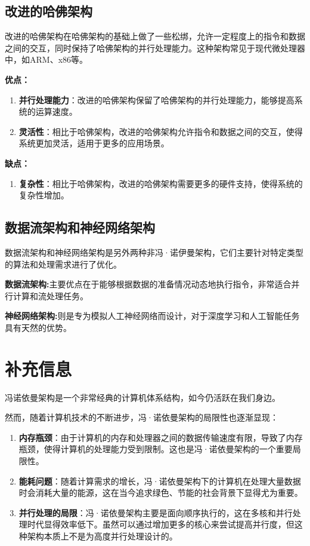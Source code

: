 \documentclass[12pt]{article} %
\theoremstyle{definition}
\begin{document}
\subsection{改进的哈佛架构}

改进的哈佛架构在哈佛架构的基础上做了一些松绑，允许一定程度上的指令和数据之间的交互，同时保持了哈佛架构的并行处理能力。这种架构常见于现代微处理器中，如ARM、x86等\cite{HarvardArchitecture, Pawson2022MythHarvard}。

\textbf{优点：}
\begin{enumerate}
  \item \textbf{并行处理能力}：改进的哈佛架构保留了哈佛架构的并行处理能力，能够提高系统的运算速度。
  \item \textbf{灵活性}：相比于哈佛架构，改进的哈佛架构允许指令和数据之间的交互，使得系统更加灵活，适用于更多的应用场景。
\end{enumerate}

\textbf{缺点：}
\begin{enumerate}
  \item \textbf{复杂性}：相比于哈佛架构，改进的哈佛架构需要更多的硬件支持，使得系统的复杂性增加。
\end{enumerate}

\subsection{数据流架构和神经网络架构}

数据流架构和神经网络架构是另外两种非冯·诺伊曼架构，它们主要针对特定类型的算法和处理需求进行了优化\cite{Siriwardhane2020ComputerArchitecture}。

\textbf{数据流架构:}主要优点在于能够根据数据的准备情况动态地执行指令，非常适合并行计算和流处理任务。

\textbf{神经网络架构:}则是专为模拟人工神经网络而设计，对于深度学习和人工智能任务具有天然的优势。

\section{补充信息}

冯诺依曼架构是一个非常经典的计算机体系结构，如今仍活跃在我们身边。

然而，随着计算机技术的不断进步，冯·诺依曼架构的局限性也逐渐显现：

\begin{enumerate}
  \item \textbf{内存瓶颈}：由于计算机的内存和处理器之间的数据传输速度有限，导致了内存瓶颈，使得计算机的处理能力受到限制。这也是冯·诺依曼架构的一个重要局限性。
  \item \textbf{能耗问题}：随着计算需求的增长，冯·诺依曼架构下的计算机在处理大量数据时会消耗大量的能源，这在当今追求绿色、节能的社会背景下显得尤为重要。
  \item \textbf{并行处理的局限}：冯·诺依曼架构主要是面向顺序执行的，这在多核和并行处理时代显得效率低下。虽然可以通过增加更多的核心来尝试提高并行度，但这种架构本质上不是为高度并行处理设计的。
\end{enumerate}
\end{document}
